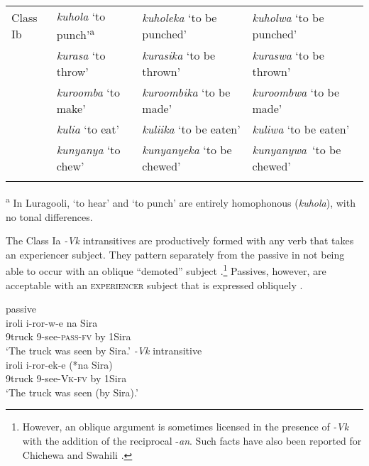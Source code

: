 \documentclass[output=paper]{langsci/lanmgscibook}
\begin{document}
\begin{table}
\begin{tabularx}{\textwidth}{lp{2.5cm}XX}
\midrule
{Class Ib} & \textit{kuhola} \newline ‘to punch’\textsuperscript{a} & \textit{kuholeka} \newline ‘to be punched’ & \textit{kuholwa} \newline ‘to be punched’\\
\tablevspace 
& \textit{kurasa} \newline ‘to throw’ & \textit{kurasika} \newline ‘to be thrown’ & \textit{kuraswa} \newline ‘to be thrown’\\
\tablevspace 
& \textit{kuroomba} \newline ‘to make’ & \textit{kuroombika} \newline ‘to be made’ & \textit{kuroombwa} \newline ‘to be made’\\
\tablevspace 
& \textit{kulia} \newline ‘to eat’ & \textit{kuliika} \newline ‘to be eaten’ & \textit{kuliwa} \newline ‘to be eaten’\\
\tablevspace 
& \textit{kunyanya} \newline ‘to chew’ & \textit{kunyanyeka} \newline ‘to be chewed’ & \textit{kunyanywa}~\newline ‘to be chewed’\\ 
\lspbottomrule
\end{tabularx}
\textsuperscript{a} In Luragooli, ‘to hear’ and ‘to punch’ are entirely homophonous (\textit{kuhola}), with no tonal differences.

\end{table}

The Class Ia \textit{-Vk} intransitives are productively formed with any verb that takes an experiencer subject. They pattern separately from the passive in not being able to occur with an oblique “demoted” subject .\footnote{However, an oblique argument is sometimes licensed in the presence of \textit{-Vk} with the addition of the reciprocal -\textit{an}. Such facts have also been reported for Chichewa and Swahili \citep{Dubinsky1996,SeidlDimitriadis2003}.} Passives, however, are acceptable with an \textsc{experiencer} subject that is expressed obliquely .

\ea\label{ex:gluckman:18}
  \ea \label{ex:gluckman:18a}
  {{passive}}\\
  \gll iroli      i-ror-w-e         na Sira\\
      9truck  9-see-\textsc{pass-fv} by 1Sira\\
  \glt ‘The truck was seen by Sira.’ 
  \ex\label{ex:gluckman:18b}
  {{\textit{-Vk}}{ intransitive}}\\
  \gll iroli    i-ror-ek-e       (*na Sira)\\
      9truck 9-see-\textsc{Vk}\textsc{-}\textsc{fv}   \hphantom{(*}by 1Sira\\
  \glt ‘The truck was seen (by Sira).’
  \z
\z
\end{document}
